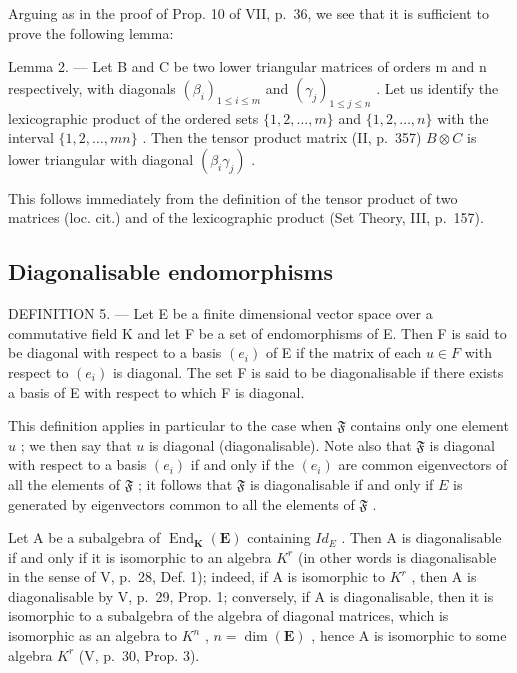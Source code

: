 Arguing as in the proof of Prop. 10 of VII, p.~36, we see that it is sufficient to prove the following lemma:

Lemma 2. --- Let B and C be two lower triangular matrices of orders m and n respectively, with diagonals \((\beta_{i})_{1\leq i\leq m}\) and \((\gamma_{j})_{1\leq j\leq n}\) . Let us identify the lexicographic product of the ordered sets \(\{1,2,\ldots,m\}\) and \(\{1,2,\ldots,n\}\) with the interval \(\{1,2,\ldots,mn\}\) . Then the tensor product matrix (II, p.~357) \(B\otimes C\) is lower triangular with diagonal \((\beta_{i}\gamma_{j})\) .

This follows immediately from the definition of the tensor product of two matrices (loc. cit.) and of the lexicographic product (Set Theory, III, p.~157).

\subsection{Diagonalisable endomorphisms}

DEFINITION 5. --- Let E be a finite dimensional vector space over a commutative field K and let F be a set of endomorphisms of E. Then F is said to be diagonal with respect to a basis \((e_{i})\) of E if the matrix of each \(u \in F\) with respect to \((e_{i})\) is diagonal. The set F is said to be diagonalisable if there exists a basis of E with respect to which F is diagonal.

This definition applies in particular to the case when \(\mathfrak{F}\) contains only one element \(u\) ; we then say that \(u\) is diagonal (diagonalisable). Note also that \(\mathfrak{F}\) is diagonal with respect to a basis \((e_i)\) if and only if the \((e_i)\) are common eigenvectors of all the elements of \(\mathfrak{F}\) ; it follows that \(\mathfrak{F}\) is diagonalisable if and only if \(E\) is generated by eigenvectors common to all the elements of \(\mathfrak{F}\) .

Let A be a subalgebra of \(\operatorname{End}_{\mathbf{K}}(\mathbf{E})\) containing \(Id_{E}\) . Then A is diagonalisable if and only if it is isomorphic to an algebra \(K^{r}\) (in other words is diagonalisable in the sense of V, p.~28, Def. 1); indeed, if A is isomorphic to \(K^{r}\) , then A is diagonalisable by V, p.~29, Prop. 1; conversely, if A is diagonalisable, then it is isomorphic to a subalgebra of the algebra of diagonal matrices, which is isomorphic as an algebra to \(K^{n}\) , \(n = \dim(\mathbf{E})\) , hence A is isomorphic to some algebra \(K^{r}\) (V, p.~30, Prop. 3).


